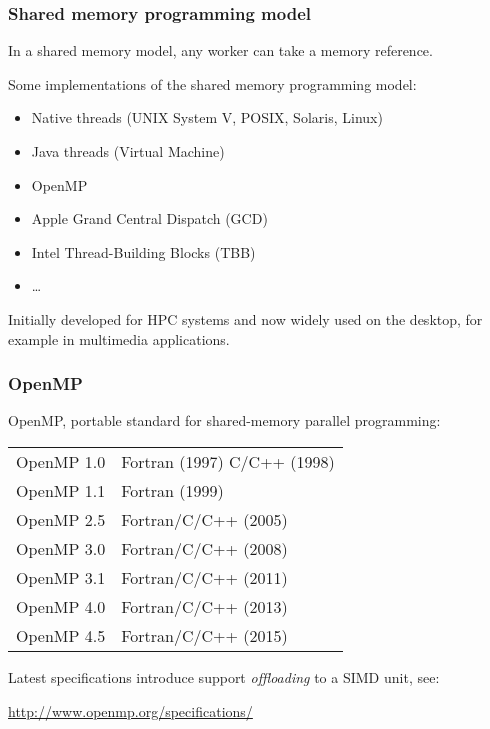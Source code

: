 \begin{frame}
\frametitle{Shared memory programming model}

In a shared memory model, any worker can take a memory reference.

\medskip
Some implementations of the shared memory programming model:
\begin{itemize}
\item Native threads (UNIX System V, POSIX, Solaris, Linux)
\item Java threads (Virtual Machine)
\item OpenMP 
\item Apple Grand Central Dispatch (GCD) 
\item Intel Thread-Building Blocks (TBB)
\item \dots
\end{itemize}

\medskip
Initially developed for HPC systems and now widely used on the desktop, for example in multimedia applications.

\end{frame}

\begin{frame}
\frametitle{OpenMP}

OpenMP, portable standard for shared-memory parallel programming:\\[2ex]
\begin{center}
\begin{tabular}{ll}
OpenMP 1.0 & Fortran (1997) C/C++ (1998)\\
OpenMP 1.1 & Fortran (1999)\\
OpenMP 2.5 & Fortran/C/C++ (2005)\\
OpenMP 3.0 & Fortran/C/C++ (2008)\\
OpenMP 3.1 & Fortran/C/C++ (2011)\\
OpenMP 4.0 & Fortran/C/C++ (2013)\\
OpenMP 4.5 & Fortran/C/C++ (2015)\\
\end{tabular}
\end{center}

Latest specifications introduce support \textit{offloading} to a SIMD unit, see:
\begin{center}
\url{http://www.openmp.org/specifications/}
\end{center}


\end{frame}


